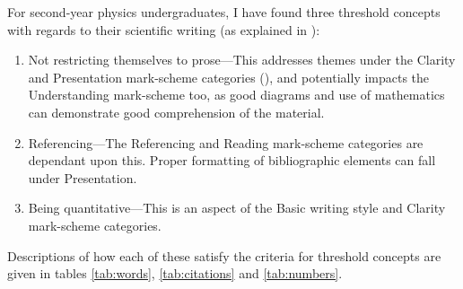 For second-year physics undergraduates, I have found three threshold concepts with regards to their scientific writing (as explained in ):
\begin{enumerate}
\item Not restricting themselves to prose---This addresses themes under the Clarity and Presentation mark-scheme categories (), and potentially impacts the Understanding mark-scheme too, as good diagrams and use of mathematics can demonstrate good comprehension of the material.
\item Referencing---The Referencing and Reading mark-scheme categories are dependant upon this. Proper formatting of bibliographic elements can fall under Presentation.
\item Being quantitative---This is an aspect of the Basic writing style and Clarity mark-scheme categories.
\end{enumerate}
Descriptions of how each of these satisfy the criteria for threshold concepts are given in tables \ref{tab:words}, \ref{tab:citations} and \ref{tab:numbers}.
